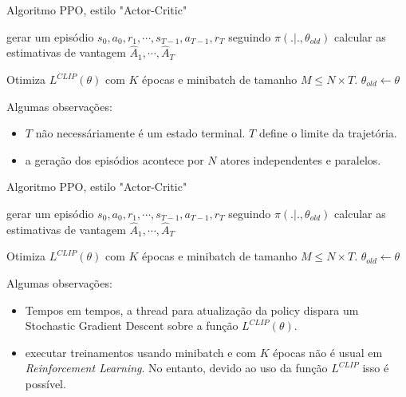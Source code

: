 \documentclass{beamer}
\begin{document}
\begin{frame}{Algoritmo PPO, estilo "Actor-Critic"}
	
	\begin{algorithmic} 
		\STATE \TA gerar um episódio ${s_{0},a_{0},r_{1},\cdots,s_{T-1},a_{T-1},r_{T}}$ seguindo $\pi(.|.,\theta_{old})$
		\STATE \TA calcular as estimativas de vantagem $\hat{A}_{1}, \cdots, \hat{A}_{T}$
		\ENDFOR
		
		\STATE Otimiza $L^{CLIP}(\theta)$ com $K$ épocas e minibatch de tamanho $M \leq N \times T$. 
		\STATE $\theta_{old} \leftarrow \theta$
		
		\ENDFOR
	\end{algorithmic}	
	
	Algumas observações: 
	
	\begin{itemize}
		\item $T$ não necessáriamente é um estado terminal. $T$ define o limite da trajetória. 
		\item a geração dos episódios acontece por $N$ atores independentes e paralelos.
	\end{itemize}
	
\end{frame}

\begin{frame}{Algoritmo PPO, estilo "Actor-Critic"}
	
	\begin{algorithmic} 
		\FOR {iterações=1,2,$\cdots$}
		\FOR {actor=1,2,$\cdots$, N}
		\STATE gerar um episódio ${s_{0},a_{0},r_{1},\cdots,s_{T-1},a_{T-1},r_{T}}$ seguindo $\pi(.|.,\theta_{old})$
		\STATE calcular as estimativas de vantagem $\hat{A}_{1}, \cdots, \hat{A}_{T}$
		\ENDFOR
		
		\STATE \TB Otimiza $L^{CLIP}(\theta)$ com $K$ épocas e minibatch de tamanho $M \leq N \times T$. 
		\STATE \TB $\theta_{old} \leftarrow \theta$
		
		\ENDFOR
	\end{algorithmic}	
	
	Algumas observações: 
	
	\begin{itemize}
		\item Tempos em tempos, a thread para atualização da policy dispara um Stochastic Gradient Descent sobre a função $L^{CLIP}(\theta)$. 
		\item executar treinamentos usando minibatch e com $K$ épocas não é usual em \textit{Reinforcement Learning}. No entanto, devido ao uso da função $L^{CLIP}$ isso é possível.  
	\end{itemize}
	
\end{frame}
\end{document}
